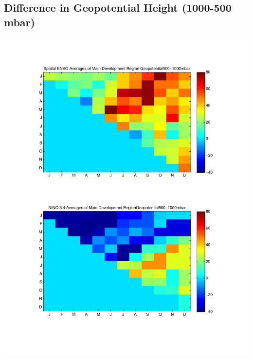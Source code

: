 \documentclass[11pt]{article}
\begin{document}
\subsection{Difference in Geopotential Height (1000-500 mbar)}
\includegraphics[scale=0.53]{images/varyingMonthsForMDRAveragesGeopotential500-1000mbar.pdf}
\end{document}
